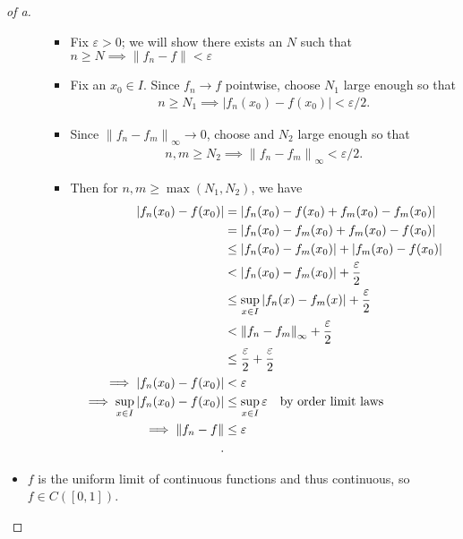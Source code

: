 \begin{solution}
\begin{proof}[of a]
\begin{itemize}
\begin{itemize}
    \begin{itemize}
    \tightlist
    \item
      Fix \({\varepsilon}> 0\); we will show there exists an \(N\) such
      that
      \(n\geq N \implies {\left\lVert {f_n - f} \right\rVert} < {\varepsilon}\)
    \item
      Fix an \(x_0 \in I\). Since \(f_n \to f\) pointwise, choose
      \(N_1\) large enough so that
      \begin{align*}n\geq N_1 \implies {\left\lvert {f_n(x_0) - f(x_0)} \right\rvert} < {\varepsilon}/2.\end{align*}
    \item
      Since \({\left\lVert {f_n - f_m} \right\rVert}_\infty \to 0\),
      choose and \(N_2\) large enough so that
      \begin{align*}n, m \geq N_2 \implies {\left\lVert {f_n - f_m} \right\rVert}_\infty < {\varepsilon}/2.\end{align*}
    \item
      Then for \(n, m \geq \max(N_1, N_2)\), we have
      \begin{align*}
        {\left\lvert {f_n(x_0) - f(x_0)} \right\rvert} 
      &=    {\left\lvert {f_n(x_0) - f(x_0) + f_m(x_0) - f_m(x_0)} \right\rvert} \\
      &=    {\left\lvert {f_n(x_0) - f_m(x_0) + f_m(x_0) - f(x_0)} \right\rvert} \\
      &\leq {\left\lvert {f_n(x_0) - f_m(x_0)} \right\rvert} + {\left\lvert {f_m(x_0) - f(x_0)} \right\rvert} \\
      &<  {\left\lvert {f_n(x_0) - f_m(x_0)} \right\rvert} + {{\varepsilon}\over 2} \\
      &\leq  \sup_{x\in I} {\left\lvert {f_n(x) - f_m(x)} \right\rvert} + {{\varepsilon}\over 2} \\
      &<  {\left\lVert {f_n - f_m} \right\rVert}_\infty + {{\varepsilon}\over 2} \\
      &\leq  {{\varepsilon}\over 2} + {{\varepsilon}\over 2} \\ 
      \implies {\left\lvert {f_n(x_0) - f(x_0)} \right\rvert} &< {\varepsilon}\\
      \implies \sup_{x\in I} {\left\lvert {f_n(x_0) - f(x_0)} \right\rvert} &\leq \sup_{x\in I} {\varepsilon}\quad\text{by order limit laws} \\
      \implies {\left\lVert {f_n - f} \right\rVert} &\leq {\varepsilon}\\
      .\end{align*}
    \end{itemize}
  \end{itemize}
\item
  \(f\) is the uniform limit of continuous functions and thus
  continuous, so \(f\in C([0, 1])\).
\end{itemize}


\end{proof}
\end{solution}
